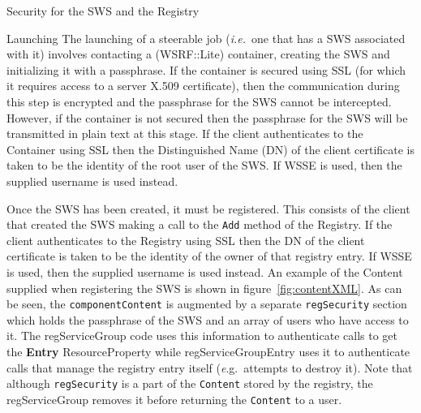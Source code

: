 \documentclass[a4paper]{article}
\begin{document}
\begin{section}{Security for the SWS and the Registry}
\begin{subsection}{Launching}
\label{sec:Launching}
The launching of a steerable job ({\it i.e.}\ one that has a SWS associated 
with it) involves contacting a (WSRF::Lite) container, creating the SWS and 
initializing it with a passphrase.  If the container is secured using SSL (for
which it requires access to a server X.509 certificate), then the communication
during this step is encrypted and the passphrase for the SWS cannot be
intercepted.  However, if the container is not secured then the passphrase
for the SWS will be transmitted in plain text at this stage.
If the client authenticates to the Container using SSL then the Distinguished 
Name (DN) of the client certificate is taken to be the identity of the root user 
of the SWS.  If WSSE is used, then the supplied username is used instead.

Once the SWS has been created, it must be registered.  This consists of 
the client that created the SWS making a call to the \texttt{Add} method 
of the Registry.  If the client authenticates to the Registry 
using SSL then the DN of the client certificate is taken
to be the identity of the owner of that registry entry.  If WSSE is used, then
the supplied username is used instead.  An example of the Content supplied when 
registering the SWS is shown in figure~\ref{fig:contentXML}.  As can be seen,
the \texttt{componentContent} is augmented by a separate \texttt{regSecurity} 
section which holds
the passphrase of the SWS and an array of users who have access to it.  The
regServiceGroup code uses this information to authenticate
calls to get the {\bf Entry} ResourceProperty while regServiceGroupEntry uses it to
authenticate calls that manage the registry entry itself ({\textit e.g.}\ attempts to
destroy it). Note that although \texttt{regSecurity} is a part of the 
\texttt{Content} stored by the registry, the regServiceGroup removes 
it before returning the \texttt{Content} to a user.


\end{subsection}
\end{section}
\end{document}
